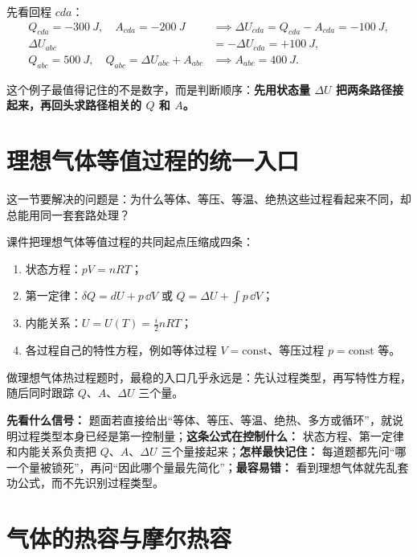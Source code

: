 \documentclass[lang=cn,11pt]{elegantbook}
\newcommand{\bridge}[1]{\begin{note}#1\end{note}}
\begin{document}
\begin{solution}
先看回程 \(cda\)：
\begin{align*}
Q_{cda}=-\SI{300}{J},\quad A_{cda}=-\SI{200}{J}
&\implies \Delta U_{cda}=Q_{cda}-A_{cda}=-\SI{100}{J},\\
\Delta U_{abc}&=-\Delta U_{cda}=+\SI{100}{J},\\
Q_{abc}=\SI{500}{J},\quad Q_{abc}=\Delta U_{abc}+A_{abc}
&\implies A_{abc}=\SI{400}{J}.
\end{align*}

这个例子最值得记住的不是数字，而是判断顺序：\textbf{先用状态量 \(\Delta U\) 把两条路径接起来，再回头求路径相关的 \(Q\) 和 \(A\)。}
\end{solution}

\section{理想气体等值过程的统一入口}

这一节要解决的问题是：为什么等体、等压、等温、绝热这些过程看起来不同，却总能用同一套套路处理？

课件把理想气体等值过程的共同起点压缩成四条：
\begin{enumerate}
  \item 状态方程：\(pV=nRT\)；
  \item 第一定律：\(\delta Q=dU+p\,\dd V\) 或 \(Q=\Delta U+\int p\,\dd V\)；
  \item 内能关系：\(U=U(T)=\frac{i}{2}nRT\)；
  \item 各过程自己的特性方程，例如等体过程 \(V=\text{const}\)、等压过程 \(p=\text{const}\) 等。
\end{enumerate}

\bridge{做理想气体热过程题时，最稳的入口几乎永远是：先认过程类型，再写特性方程，随后同时跟踪 \(Q\)、\(A\)、\(\Delta U\) 三个量。}

\begin{note}
\textbf{先看什么信号：} 题面若直接给出“等体、等压、等温、绝热、多方或循环”，就说明过程类型本身已经是第一控制量；\textbf{这条公式在控制什么：} 状态方程、第一定律和内能关系负责把 \(Q\)、\(A\)、\(\Delta U\) 三个量接起来；\textbf{怎样最快记住：} 每道题都先问“哪一个量被锁死”，再问“因此哪个量最先简化”；\textbf{最容易错：} 看到理想气体就先乱套功公式，而不先识别过程类型。
\end{note}

\section{气体的热容与摩尔热容}
\end{document}
